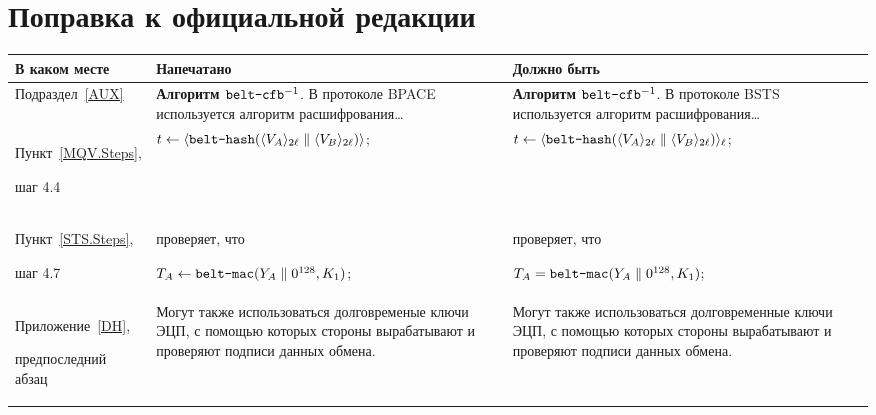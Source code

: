\clearpage
\chapter*{\mbox{}\hfill Поправка к официальной редакции\hfill\mbox{}}

\mbox{}

\begin{center}
\begin{tabular}{|p{2.9cm}|p{6.2cm}|p{6.4cm}|}
\hline
В каком месте & Напечатано & Должно быть\\
\hline
\hline
Подраздел~\ref{AUX}
&
{\bf Алгоритм $\texttt{belt-cfb}^{-1}$}.
В протоколе BPACE используется алгоритм расшифрования\ldots
&
{\bf Алгоритм $\texttt{belt-cfb}^{-1}$}.
В протоколе BSTS используется алгоритм расшифрования\ldots 
\\
\hline
Пункт~\ref{MQV.Steps},\par
шаг 4.4
&
$t\leftarrow\langle\texttt{belt-hash}
(\langle V_A\rangle_{2\ell}\parallel\langle V_B\rangle_{2\ell})\rangle$;
&
$t\leftarrow\langle\texttt{belt-hash}
(\langle V_A\rangle_{2\ell}\parallel\langle V_B\rangle_{2\ell})\rangle_\ell$;
\\
\hline
Пункт~\ref{STS.Steps},\par
шаг 4.7
&
проверяет, что\par
$T_A\leftarrow\texttt{belt-mac}(Y_A\parallel 0^{128}, K_1)$;
&
проверяет, что\par
$T_A=\texttt{belt-mac}(Y_A\parallel 0^{128}, K_1)$;
\\
\hline
Приложение~\ref{DH},\par
предпоследний абзац
&
Могут также использоваться долговременые 
ключи ЭЦП, с помощью которых стороны вырабатывают и проверяют
подписи данных обмена.
&
Могут также использоваться долговременные 
ключи ЭЦП, с помощью которых стороны вырабатывают и проверяют
подписи данных обмена.
\\
\hline
\end{tabular}
\end{center}